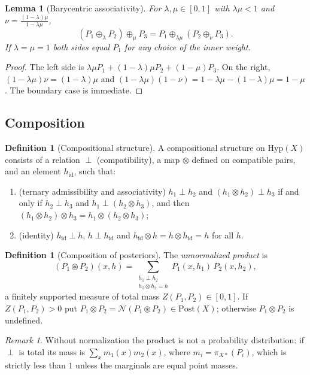 \documentclass[11pt]{article}
\newtheorem{lemma}[theorem]{Lemma}
\theoremstyle{definition}
\newtheorem{definition}[theorem]{Definition}
\theoremstyle{remark}
\newtheorem{remark}[theorem]{Remark}
\newcommand{\Hyp}{\mathrm{Hyp}}
\newcommand{\Post}{\mathrm{Post}}
\newcommand{\hid}{h_{\mathrm{id}}}
\newcommand{\N}{\mathcal{N}}
\newcommand{\cp}{\circledast}
\begin{document}
\begin{lemma}[Barycentric associativity]\label{lem:baryassoc}
For $\lambda,\mu\in[0,1]$ with $\lambda\mu<1$ and $\nu=\frac{(1-\lambda)\mu}{1-\lambda\mu}$,
\[
(P_1\oplus_\lambda P_2)\oplus_\mu P_3 = P_1\oplus_{\lambda\mu}(P_2\oplus_\nu P_3).
\]
If $\lambda=\mu=1$ both sides equal $P_1$ for any choice of the inner weight.
\end{lemma}
\begin{proof}
The left side is $\lambda\mu P_1+(1-\lambda)\mu P_2+(1-\mu)P_3$. On the right,
$(1-\lambda\mu)\nu=(1-\lambda)\mu$ and $(1-\lambda\mu)(1-\nu)=1-\lambda\mu-(1-\lambda)\mu=1-\mu$. The
boundary case is immediate.
\end{proof}

\subsection{Composition}

\begin{definition}[Compositional structure]\label{def:comp}
A compositional structure on $\Hyp(X)$ consists of a relation $\perp$ (compatibility), a map
$\otimes$ defined on compatible pairs, and an element $\hid$, such that:
\begin{enumerate}[label=(A\arabic*)]
\item (ternary admissibility and associativity) $h_1\perp h_2$ and $(h_1\otimes h_2)\perp h_3$ if and
  only if $h_2\perp h_3$ and $h_1\perp(h_2\otimes h_3)$, and then
  $(h_1\otimes h_2)\otimes h_3=h_1\otimes(h_2\otimes h_3)$;
\item (identity) $\hid\perp h$, $h\perp\hid$ and $\hid\otimes h=h\otimes\hid=h$ for all $h$.
\end{enumerate}
\end{definition}

\begin{definition}[Composition of posteriors]
The \emph{unnormalized product} is
\[
(P_1\cp P_2)(x,h)=\sum_{\substack{h_1\perp h_2\\ h_1\otimes h_2=h}}P_1(x,h_1)\,P_2(x,h_2),
\]
a finitely supported measure of total mass $Z(P_1,P_2)\in[0,1]$. If $Z(P_1,P_2)>0$ put
$P_1\otimes P_2=\N(P_1\cp P_2)\in\Post(X)$; otherwise $P_1\otimes P_2$ is undefined.
\end{definition}

\begin{remark}
Without normalization the product is not a probability distribution: if $\perp$ is total its mass
is $\sum_x m_1(x)m_2(x)$, where $m_i=\pi_{X*}(P_i)$, which is strictly less than $1$ unless the
marginals are equal point masses.
\end{remark}
\end{document}
